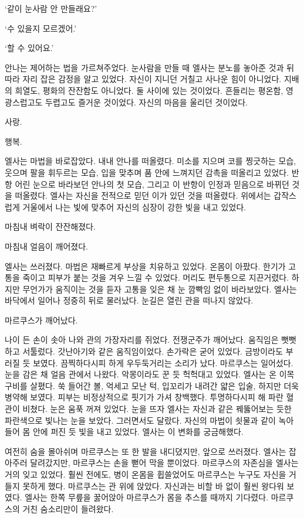`같이 눈사람 안 만들래요?'

` 수 있을지 모르겠어.'

`할 수 있어요.'

안나는 제어하는 법을 가르쳐주었다. 눈사람을 만들 때 엘사는 분노를 놓아준 것과 뒤따라 자리 잡은 감정을 알고 있었다. 자신이 지니던 거칠고 사나운 힘이 아니었다. 지배의 희열도, 평화의 잔잔함도 아니었다. 둘 사이에 있는 것이었다. 흔들리는 평온함, 영광스럽고도 두렵고도 즐거운 것이었다. 자신의 마음을 울리던 것이었다.

사랑.

행복.

엘사는 마법을 바로잡았다. 내내 안나를 떠올렸다. 미소를 지으며 코를 찡긋하는 모습, 웃으며 팔을 휘두르는 모습, 입을 맞추며 품 안에 느껴지던 감촉을 떠올리고 있었다. 반항 어린 눈으로 바라보던 안나의 첫 모습, 그리고 이 반항이 인정과 믿음으로 바뀌던 것을 떠올렸다. 엘사는 자신을 전적으로 믿던 이가 있던 것을 떠올렸다. 위에서는 갑작스럽게 거울에서 나는 빛에 맞추어 자신의 심장이 강한 빛을 내고 있었다.

마침내 벼락이 잔잔해졌다.

마침내 얼음이 깨어졌다.

엘사는 쓰러졌다. 마법은 재빠르게 부상을 치유하고 있었다. 온몸이 아팠다. 한기가 고통을 죽이고 피부가 붙는 것을 겨우 느낄 수 있었다. 머리도 편두통으로 지끈거렸다. 하지만 무언가가 움직이는 것을 듣자 고통을 잊은 채 눈 깜빡임 없이 바라보았다. 엘사는 바닥에서 일어나 정중히 뒤로 물러났다. 눈길은 열린 관을 떠나지 않았다.

마르쿠스가 깨어났다.

나이 든 손이 솟아 나와 관의 가장자리를 쥐었다. 전쟁군주가 깨어났다. 움직임은 뻣뻣하고 서툴렀다. 갓난아기와 같은 움직임이었다. 손가락은 굳어 있었다. 금방이라도 부러질 듯 보였다. 끔찍하다시피 하게 우두둑거리는 소리가 났다. 마르쿠스는 일어섰다. 눈을 감은 채 얼음 관에서 나왔다. 악몽이라도 꾼 듯 헉헉대고 있었다. 엘사는 온 이목구비를 살폈다. 쑥 들어간 볼, 억세고 모난 턱, 입꼬리가 내려간 얇은 입술, 하지만 더욱 병약해 보였다. 피부는 비정상적으로 핏기가 가셔 창백했다. 투명하다시피 해 파란 혈관이 비쳤다. 눈은 움푹 꺼져 있었다. 눈을 뜨자 엘사는 자신과 같은 꿰뚫어보는 듯한 파란색으로 빛나는 눈을 보았다. 그러면서도 달랐다. 자신의 마법이 쇳물과 같이 녹아들어 몸 안에 퍼진 듯 빛을 내고 있었다. 엘사는 이 변화를 궁금해했다.

여전히 숨을 몰아쉬며 마르쿠스는 또 한 발을 내디뎠지만, 앞으로 쓰러졌다. 엘사는 잡아주러 달려갔지만, 마르쿠스는 손을 뻗어 막을 뿐이었다. 마르쿠스의 자존심을 엘사는 거의 잊고 있었다. 훨씬 전에도, 병이 온몸을 휩쓸었어도 마르쿠스는 누구도 자신을 거들지 못하게 했다. 마르쿠스는 관 위에 앉았다. 자신과는 비할 바 없이 훨씬 왕다워 보였다. 엘사는 한쪽 무릎을 꿇어앉아 마르쿠스가 몸을 추스를 때까지 기다렸다. 마르쿠스의 거친 숨소리만이 들려왔다.

